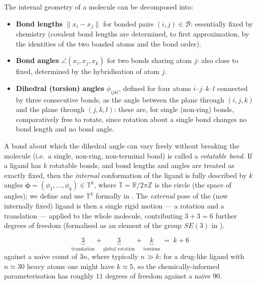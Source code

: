 \documentclass[11pt,a4paper]{report}
\theoremstyle{definition}
\theoremstyle{remark}
\newcommand{\RR}{\mathbb R}
\begin{document}
The internal geometry of a molecule can be decomposed into:
\begin{itemize}
\item \textbf{Bond lengths} $\|x_i - x_j\|$ for bonded pairs $(i,j)\in\mathcal B$:
essentially fixed by chemistry (covalent bond lengths are determined, to
first approximation, by the identities of the two bonded atoms and the bond
order).
\item \textbf{Bond angles} $\angle(x_i,x_j,x_k)$ for two bonds sharing atom
$j$: also close to fixed, determined by the hybridisation of atom $j$.
\item \textbf{Dihedral (torsion) angles} $\phi_{ijkl}$, defined for four
atoms $i$--$j$--$k$--$l$ connected by three consecutive bonds, as the angle
between the plane through $(i,j,k)$ and the plane through $(j,k,l)$: these
are, for single (non-ring) bonds, comparatively free to rotate, since
rotation about a single bond changes no bond length and no bond angle.
\end{itemize}

A bond about which the dihedral angle can vary freely without breaking the
molecule (i.e.\ a single, non-ring, non-terminal bond) is called a
\emph{rotatable bond}. If a ligand has $k$ rotatable bonds, and bond lengths
and angles are treated as exactly fixed, then the \emph{internal}
conformation of the ligand is fully described by $k$ angles
$\bm\phi = (\phi_1,\dots,\phi_k) \in \mathbb T^k$, where
$\mathbb T = \RR/2\pi\mathbb Z$ is the circle (the space of angles); we
define and use $\mathbb T^k$ formally in . The
\emph{external} pose of the (now internally fixed) ligand is then a single
rigid motion --- a rotation and a translation --- applied to the whole
molecule, contributing $3+3=6$ further degrees of freedom (formalised as an
element of the group $SE(3)$ in ).

\begin{center}
\begin{tcolorbox}[colback=blue!4,colframe=blue!40!black,title=\textbf{Degrees of freedom of a ligand pose},boxrule=0.4pt]
\[
\underbrace{3}_{\text{translation}}
+
\underbrace{3}_{\text{global rotation}}
+
\underbrace{k}_{\text{torsions}}
\;=\; k+6
\]
against a naive count of $3n$, where typically $n \gg k$: for a
drug-like ligand with $n\approx 30$ heavy atoms one might have $k\approx 5$,
so the chemically-informed parameterisation has roughly $11$ degrees of
freedom against a naive $90$.
\end{tcolorbox}
\end{center}
\end{document}
